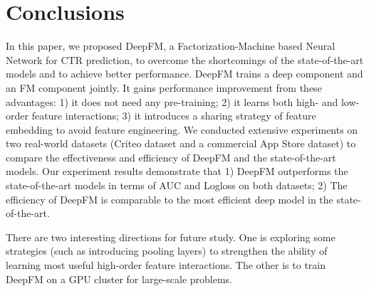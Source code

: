 \section{Conclusions}\label{section:conclusion}

In this paper, we proposed DeepFM, a Factorization-Machine based Neural Network for CTR prediction, to overcome the shortcomings of the state-of-the-art models and to achieve better performance. DeepFM trains a deep component and an FM component jointly. It gains performance improvement from these advantages: 1) it does not need any pre-training; 2) it learns both high- and low-order feature interactions; 3) it introduces a sharing strategy of feature embedding to avoid feature engineering. We conducted extensive experiments on two real-world datasets (Criteo dataset and a commercial App Store dataset) to compare the effectiveness and efficiency of DeepFM and the state-of-the-art models. Our experiment results demonstrate that 1) DeepFM outperforms the state-of-the-art models in terms of AUC and Logloss on both datasets; 2) The efficiency of DeepFM is comparable to the most efficient deep model in the state-of-the-art.

There are two interesting directions for future study. One is exploring some strategies (such as introducing pooling layers) to strengthen the ability of learning most useful high-order feature interactions. The other is to train DeepFM on a GPU cluster for large-scale problems.
